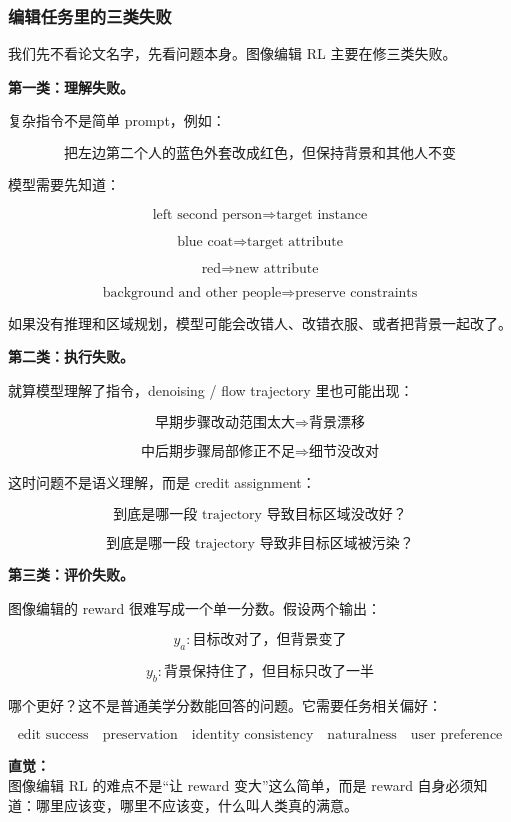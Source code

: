 \subsubsection{编辑任务里的三类失败}

我们先不看论文名字，先看问题本身。图像编辑 RL 主要在修三类失败。

\textbf{第一类：理解失败。}

复杂指令不是简单 prompt，例如：

\[
\text{把左边第二个人的蓝色外套改成红色，但保持背景和其他人不变}
\]

模型需要先知道：

\[
\text{left second person}
\Rightarrow
\text{target instance}
\]

\[
\text{blue coat}
\Rightarrow
\text{target attribute}
\]

\[
\text{red}
\Rightarrow
\text{new attribute}
\]

\[
\text{background and other people}
\Rightarrow
\text{preserve constraints}
\]

如果没有推理和区域规划，模型可能会改错人、改错衣服、或者把背景一起改了。

\textbf{第二类：执行失败。}

就算模型理解了指令，denoising / flow trajectory 里也可能出现：

\[
\text{早期步骤改动范围太大}
\Rightarrow
\text{背景漂移}
\]

\[
\text{中后期步骤局部修正不足}
\Rightarrow
\text{细节没改对}
\]

这时问题不是语义理解，而是 credit assignment：

\[
\text{到底是哪一段 trajectory 导致目标区域没改好？}
\]

\[
\text{到底是哪一段 trajectory 导致非目标区域被污染？}
\]

\textbf{第三类：评价失败。}

图像编辑的 reward 很难写成一个单一分数。假设两个输出：

\[
y_a:
\text{目标改对了，但背景变了}
\]

\[
y_b:
\text{背景保持住了，但目标只改了一半}
\]

哪个更好？这不是普通美学分数能回答的问题。它需要任务相关偏好：

\[
\text{edit success}
\quad
\text{preservation}
\quad
\text{identity consistency}
\quad
\text{naturalness}
\quad
\text{user preference}
\]

\begin{intubox}
\textbf{直觉：}\\
图像编辑 RL 的难点不是“让 reward 变大”这么简单，而是 reward 自身必须知道：哪里应该变，哪里不应该变，什么叫人类真的满意。
\end{intubox}

